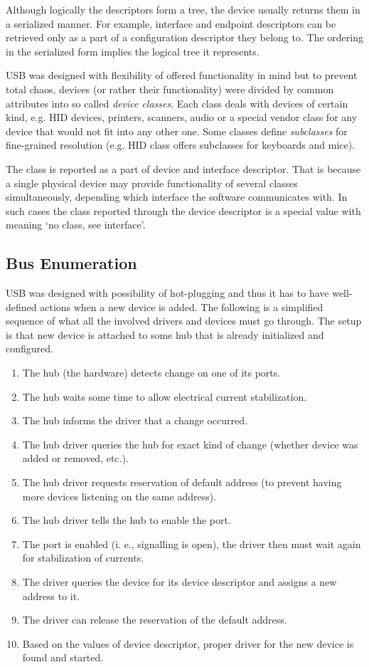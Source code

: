 Although logically the descriptors form a tree, the device usually returns them
in a serialized manner. For example, interface and endpoint descriptors can be
retrieved only as a part of a configuration descriptor they belong to. The
ordering in the serialized form implies the logical tree it represents.

USB was designed with flexibility of offered functionality in mind but to
prevent total chaos, devices (or rather their functionality) were divided by
common attributes into so called \textit{device classes}. Each class deals with
devices of certain kind, e.g. HID devices, printers, scanners, audio or a
special vendor class for any device that would not fit into any other one. Some
classes define \textit{subclasses} for fine-grained resolution (e.g. HID class
offers subclasses for keyboards and mice).

The class is reported as a part of device and interface descriptor. That is
because a single physical device may provide functionality of several classes
simultaneously, depending which interface the software communicates with. In
such cases the class reported through the device descriptor is a special value
with meaning ‘no class, see interface’.

\subsection{Bus Enumeration}

USB was designed with possibility of hot-plugging and thus it has to have
well-defined actions when a new device is added. The following is a simplified
sequence of what all the involved drivers and devices must go through. The
setup is that new device is attached to some hub that is already initialized
and configured.

\begin{enumerate}
\item The hub (the hardware) detects change on one of its ports.
\item The hub waits some time to allow electrical current stabilization.
\item The hub informs the driver that a change occurred.
\item The hub driver queries the hub for exact kind of change (whether device
was added or removed, etc.).
\item The hub driver requests reservation of default address (to prevent having
more devices listening on the same address).
\item The hub driver tells the hub to enable the port.
\item The port is enabled (i. e., signalling is open), the driver then must wait
again for stabilization of currents.
\item The driver queries the device for its device descriptor and assigns a new
address to it.
\item The driver can release the reservation of the default address.
\item Based on the values of device descriptor, proper driver for the new
device is found and started.
\end{enumerate}

